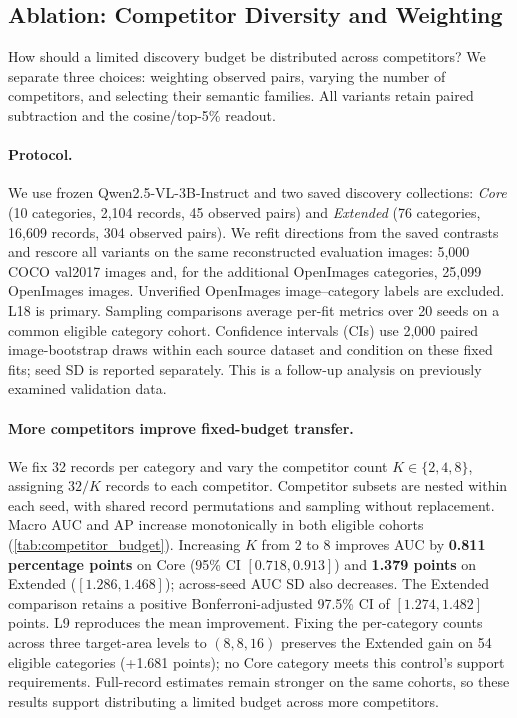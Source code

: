 \subsection{Ablation: Competitor Diversity and Weighting}
\label{sec:competitor_ablation}

How should a limited discovery budget be distributed across competitors?
We separate three choices: weighting observed pairs, varying the number of
competitors, and selecting their semantic families. All variants retain
paired subtraction and the cosine/top-5\% readout.

\paragraph{Protocol.}
We use frozen Qwen2.5-VL-3B-Instruct and two saved discovery collections:
\emph{Core} (10 categories, 2,104 records, 45 observed pairs) and
\emph{Extended} (76 categories, 16,609 records, 304 observed pairs).
We refit directions from the saved contrasts and rescore all variants on
the same reconstructed evaluation images: 5,000 COCO val2017 images and,
for the additional OpenImages categories, 25,099 OpenImages images.
Unverified OpenImages image--category labels are excluded.
L18 is primary. Sampling comparisons average per-fit metrics over 20
seeds on a common eligible category cohort. Confidence intervals (CIs)
use 2,000 paired image-bootstrap draws within each source dataset and
condition on these fixed fits; seed SD is reported separately.
This is a follow-up analysis on previously examined validation data.



\paragraph{More competitors improve fixed-budget transfer.}
We fix 32 records per category and vary the competitor count
\(K\in\{2,4,8\}\), assigning \(32/K\) records to each competitor.
Competitor subsets are nested within each seed, with shared record
permutations and sampling without replacement.
Macro AUC and AP increase monotonically in both eligible cohorts
(\cref{tab:competitor_budget}). Increasing \(K\) from 2 to 8 improves
AUC by \textbf{0.811 percentage points} on Core
(95\% CI \([0.718,0.913]\)) and \textbf{1.379 points} on Extended
(\([1.286,1.468]\)); across-seed AUC SD also decreases.
The Extended comparison retains a positive Bonferroni-adjusted 97.5\% CI
of \([1.274,1.482]\) points. L9 reproduces the mean improvement.
Fixing the per-category counts across three target-area levels to
\((8,8,16)\) preserves the Extended gain on 54 eligible categories
(+1.681 points); no Core category meets this control's support requirements.
Full-record estimates remain stronger on the same cohorts, so these
results support distributing a limited budget across more competitors.

